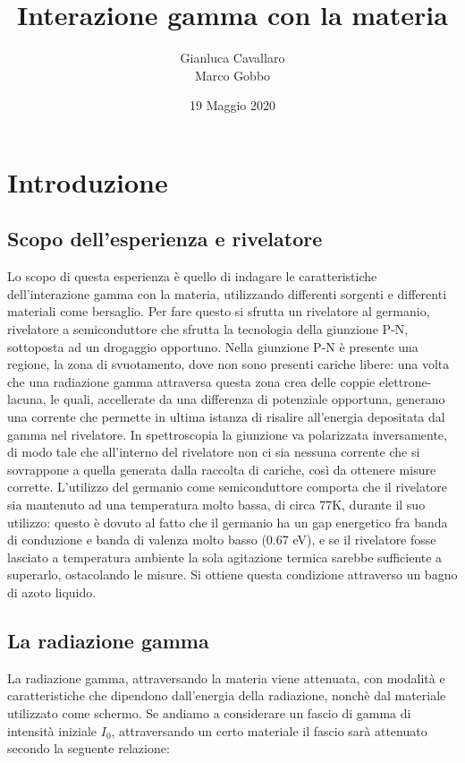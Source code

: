 \documentclass[a4paper,10pt]{article}
\title{Interazione gamma con la materia}
\author{Gianluca Cavallaro \\ Marco Gobbo}
\date{19 Maggio 2020}
\begin{document}
\maketitle


\section{Introduzione}
\subsection{Scopo dell'esperienza e rivelatore}
Lo scopo di questa esperienza è quello di indagare le caratteristiche dell'interazione gamma con la materia, utilizzando differenti sorgenti e differenti materiali come bersaglio. Per fare questo si sfrutta un rivelatore al germanio, rivelatore a semiconduttore che sfrutta la tecnologia della giunzione P-N, sottoposta ad un drogaggio opportuno. Nella giunzione P-N è presente una regione, la zona di svuotamento, dove non sono presenti cariche libere: una volta che una radiazione gamma attraversa questa zona crea delle coppie elettrone-lacuna, le quali, accellerate da una differenza di potenziale opportuna, generano una corrente che permette in ultima istanza di risalire all'energia depositata dal gamma nel rivelatore. In spettroscopia la giunzione va polarizzata inversamente, di modo tale che all'interno del rivelatore non ci sia nessuna corrente che si sovrappone a quella generata dalla raccolta di cariche, così da ottenere misure corrette. L'utilizzo del germanio come semiconduttore comporta che il rivelatore sia mantenuto ad una temperatura molto bassa, di circa 77K, durante il suo utilizzo: questo è dovuto al fatto che il germanio ha un gap energetico fra banda di conduzione e banda di valenza molto basso (0.67 eV), e se il rivelatore fosse lasciato a temperatura ambiente la sola agitazione termica sarebbe sufficiente a superarlo, ostacolando le misure. Si ottiene questa condizione attraverso un bagno di azoto liquido.

\subsection{La radiazione gamma}
La radiazione gamma, attraversando la materia viene attenuata, con modalità e caratteristiche che dipendono dall'energia della radiazione, nonchè dal materiale utilizzato come schermo. Se andiamo a considerare un fascio di gamma di intensità iniziale $I_0$, attraversando un certo materiale il fascio sarà attenuato secondo la seguente relazione:
\end{document}
